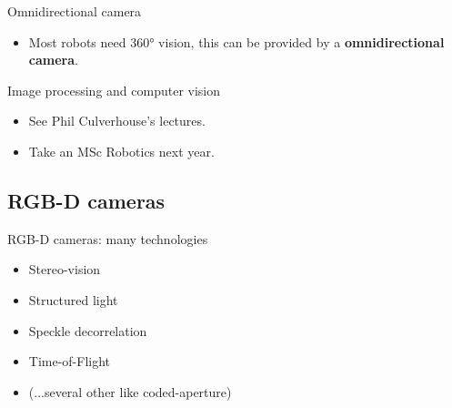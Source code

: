 \documentclass[compress]{beamer}
\begin{document}
\begin{frame}{Omnidirectional camera}

    \begin{itemize}

        \item
              Most robots need 360° vision, this can be provided by a
              \textbf{omnidirectional camera}.
    \end{itemize}

\end{frame}

\begin{frame}{Image processing and computer vision}

    \begin{itemize}

        \item
              See Phil Culverhouse's lectures.
        \item
              Take an MSc Robotics next year.
    \end{itemize}

\end{frame}

\subsection{RGB-D cameras}

\begin{frame}{RGB-D cameras: many technologies}
    \begin{itemize}
        \item Stereo-vision
        \item Structured light
        \item Speckle decorrelation
        \item Time-of-Flight
        \item (...several other like coded-aperture)
    \end{itemize}
\end{frame}


\end{document}
